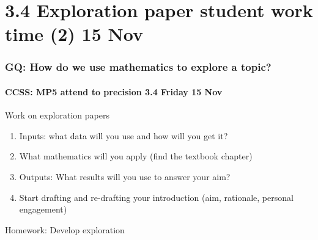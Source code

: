 \documentclass{beamer}
\begin{document}
\section{3.4 Exploration paper student work time (2) 15 Nov}
\frame
{
  \frametitle{GQ: How do we use mathematics to explore a topic?}
  \framesubtitle{CCSS: MP5 attend to precision \hfill \alert{3.4 Friday 15 Nov}}

  \begin{block}{Work on exploration papers}
  \begin{enumerate}
      \item Inputs: what data will you use and how will you get it? 
      \item What mathematics will you apply (find the textbook chapter)
      \item Outputs: What results will you use to answer your aim?
      \item Start drafting and re-drafting your introduction (aim, rationale, personal engagement)
  \end{enumerate}
  \end{block}
  Homework: Develop exploration 
}
\end{document}
